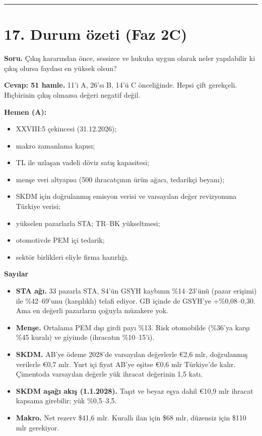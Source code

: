 \begin{center}\rule{0.5\linewidth}{0.5pt}\end{center}

\hypertarget{02c_hazirlik-17-durum-uxf6zeti-faz-2c}{%
\section{17. Durum özeti (Faz 2C)}\label{02c_hazirlik-17-durum-uxf6zeti-faz-2c}}

\textbf{Soru.} Çıkış kararından önce, sessizce ve hukuka uygun olarak neler yapılabilir ki çıkış olursa faydası en yüksek olsun?

\textbf{Cevap: 51 hamle.} 11'i A, 26'sı B, 14'ü C önceliğinde. Hepsi çift gerekçeli. Hiçbirinin çıkış olmazsa değeri negatif değil.

\textbf{Hemen (A):}

\begin{itemize}
\tightlist
\item
  XXVIII:5 çekincesi (31.12.2026);
\item
  makro zamanlama kapısı;
\item
  TL ile uzlaşan vadeli döviz satış kapasitesi;
\item
  menşe veri altyapısı (500 ihracatçının ürün ağacı, tedarikçi beyanı);
\item
  SKDM için doğrulanmış emisyon verisi ve varsayılan değer revizyonuna Türkiye verisi;
\item
  yükselen pazarlarla STA; TR--BK yükseltmesi;
\item
  otomotivde PEM içi tedarik;
\item
  sektör birlikleri eliyle firma hazırlığı.
\end{itemize}

\textbf{Sayılar \etiketT{}}

\begin{itemize}
\tightlist
\item
  \textbf{STA ağı.} 33 pazarla STA, S4'ün GSYH kaybının \%14--23'ünü (pazar erişimi) ile \%42--69'unu (karşılıklı) telafi ediyor. GB içinde de GSYH'ye +\%0,08--0,30. Ama en değerli pazarların çoğuyla müzakere yok.
\item
  \textbf{Menşe.} Ortalama PEM dışı girdi payı \%13. Risk otomobilde (\%36'ya karşı \%45 kuralı) ve giyimde (ihracatın \%10--15'i).
\item
  \textbf{SKDM.} AB'ye ödeme 2028'de varsayılan değerlerle €2,6 mlr, doğrulanmış verilerle €0,7 mlr. Yurt içi fiyat AB'ye eşitse €0,6 mlr Türkiye'de kalır. Çimentoda varsayılan değerle yük ihracat değerinin 1,5 katı.
\item
  \textbf{SKDM aşağı akış (1.1.2028).} Taşıt ve beyaz eşya dahil €10,9 mlr ihracat kapsama girebilir; yük \%0,5--3,5.
\item
  \textbf{Makro.} Net rezerv \$41,6 mlr. Kurallı ilan için \$68 mlr, düzensiz için \$110 mlr gerekiyor.
\end{itemize}

